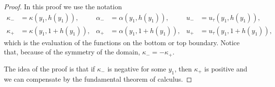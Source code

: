 \documentclass{article}
\theoremstyle{definition}
\theoremstyle{definition}
\begin{document}
\begin{proof}
In this proof we use the notation 
\begin{equation}
    \label{defKappaAlphaUpm}
    \begin{aligned}
        \kappa_-&=\kappa(y_1,h(y_1)), & \alpha_-&=\alpha(y_1,h(y_1)), & u_-&=u_\tau(y_1,h(y_1)),
        \\
        \kappa_+&=\kappa(y_1,1+h(y_1)), & \alpha_+&=\alpha(y_1,1+h(y_1)), & u_+&=u_\tau(y_1,1+h(y_1)),
    \end{aligned}
\end{equation}
which is the evaluation of the functions on the bottom or top boundary. Notice that, because of the symmetry of the domain, $\kappa_-=-\kappa_+$.


The idea of the proof is that if $\kappa_-$ is negative for some $y_1$, then $\kappa_+$ is positive and we can compensate by the fundamental theorem of calculus.


\end{proof}
\end{document}
